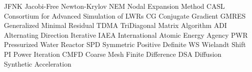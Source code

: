 \makeglossaries

    {JFNK}    {Jacobi-Free Newton-Krylov}
     {NEM}     {Nodal Expansion Method}
    {CASL}    {Consortium for Advanced Simulation of LWRs}
      {CG}      {Conjugate Gradient}
   {GMRES}   {Generalized Minimal Residual}
    {TDMA}    {TriDiagonal Matrix Algorithm}
     {ADI}     {Alternating Direction Iterative}
    {IAEA}    {International Atomic Energy Agency}
     {PWR}     {Pressurized Water Reactor}
     {SPD}     {Symmetric Positive Definite}
      {WS}      {Wielandt Shift}
      {PI}      {Power Iteration}
    {CMFD}    {Coarse Mesh Finite Difference}
     {DSA}     {Diffusion Synthetic Acceleration}
